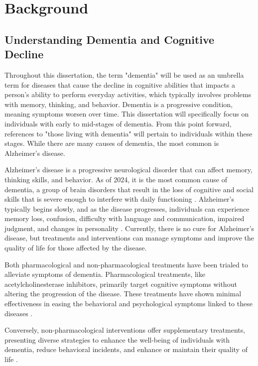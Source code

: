 \documentclass{l4proj}
\begin{document}
\chapter{Background}

\section{Understanding Dementia and Cognitive Decline}

Throughout this dissertation, the term "dementia" will be used as an umbrella term for diseases that cause the decline in cognitive abilities that impacts a person's ability to perform everyday activities, which typically involves problems with memory, thinking, and behavior. Dementia is a progressive condition, meaning symptoms worsen over time. This dissertation will specifically focus on individuals with early to mid-stages of dementia. From this point forward, references to "those living with dementia" will pertain to individuals within these stages. While there are many causes of dementia, the most common is Alzheimer's disease.

Alzheimer's disease is a progressive neurological disorder that can affect memory, thinking skills, and behavior. As of 2024, it is the most common cause of dementia, a group of brain disorders that result in the loss of cognitive and social skills that is severe enough to interfere with daily functioning \cite{li_china_2024}. Alzheimer's typically begins slowly, and as the disease progresses, individuals can experience memory loss, confusion, difficulty with language and communication, impaired judgment, and changes in personality \cite{li_china_2024}. Currently, there is no cure for Alzheimer's disease, but treatments and interventions can manage symptoms and improve the quality of life for those affected by the disease.

Both pharmacological and non-pharmacological treatments have been trialed to alleviate symptoms of dementia. Pharmacological treatments, like acetylcholinesterase inhibitors, primarily target cognitive symptoms without altering the progression of the disease. These treatments have shown minimal effectiveness in easing the behavioral and psychological symptoms linked to these diseases \citep{dyer_overview_2018}.

Conversely, non-pharmacological interventions offer supplementary treatments, presenting diverse strategies to enhance the well-being of individuals with dementia, reduce behavioral incidents, and enhance or maintain their quality of life \citep{dyer_overview_2018}.
\end{document}
